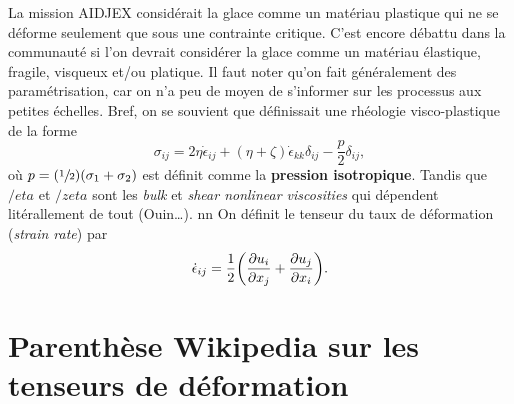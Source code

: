 \documentclass[10pt]{article}
\numberwithin{equation}{section}
\begin{document}
La mission AIDJEX considérait la glace comme un matériau plastique qui ne se déforme seulement que sous une contrainte critique.
C'est encore débattu dans la communauté si l'on devrait considérer la glace comme un matériau élastique, fragile, visqueux et/ou platique.
Il faut noter qu'on fait généralement des paramétrisation, car on n'a peu de moyen de s'informer sur les processus aux petites échelles.
Bref, on se souvient que \Textcite{hibler1979dynamic} définissait une rhéologie visco-plastique de la forme
\begin{equation}
   \sigma_{ij} = 2\eta \dot{\epsilon}_{ij} + (\eta + \zeta)\dot{\epsilon}_{kk} \delta_{ij} - \frac{p}{2}\delta_{ij},
\end{equation}
où \(p = (\sfrac{1}{2})(\sigma_1 + \sigma_2)\) est définit comme la \textbf{pression isotropique}.
Tandis que \(/eta\) et \(/zeta\) sont les \emph{bulk} et \emph{shear nonlinear viscosities} qui dépendent litérallement de tout (Ouin\ldots{}).
nn
On définit le tenseur du taux de déformation (\emph{strain rate}) par
\begin{equation}
\label{eq:orgc443346}
   \dot{\epsilon}_{ij} = \frac{1}{2}\qty(\pdv{u_i}{x_j} + \pdv{u_j}{x_i}). 
\end{equation}
\section{Parenthèse Wikipedia sur les tenseurs de déformation}
\label{sec:orgc5f4b16}
\end{document}
